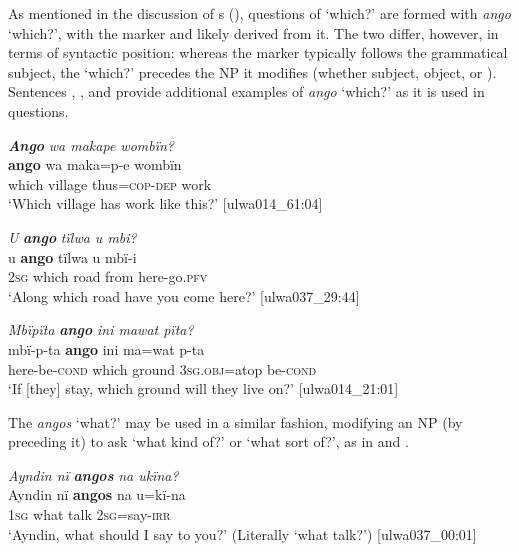 As mentioned in the discussion of s (), questions of ‘which?’ are formed with \textit{ango} ‘which?’,  with the  marker and likely derived from it. The two differ, however, in terms of syntactic position: whereas the  marker typically follows the grammatical subject, the  ‘which?’ precedes the NP it modifies (whether subject, object, or ). Sentences , , and  provide additional examples of \textit{ango} ‘which?’ as it is used in questions.

\ea%
    \label{ex:syntax:31}
          \textbf{\textit{Ango}} \textit{wa makape wombïn?}\\
\gll    \textbf{ango}  wa     maka=p-e    wombïn\\
    which  village  thus=\textsc{cop-dep}  work\\
\glt `Which village has work like this?’ [ulwa014\_61:04]
\z

\ea%
    \label{ex:syntax:32}
          \textit{U} \textbf{\textit{ango}} \textit{tïlwa u mbi?}\\
\gll    u    \textbf{ango}  tïlwa  u    mbï-i\\
    2\textsc{sg}  which  road  from  here-go.\textsc{pfv}\\
\glt `Along which road have you come here?’ [ulwa037\_29:44]
\z

\ea%
    \label{ex:syntax:33}
          \textit{Mbïpïta} \textbf{\textit{ango}} \textit{ini mawat pïta?}\\
\gll    mbï-p-ta    \textbf{ango}  ini    ma=wat    p-ta\\
    here-be\textsc{{}-cond} which  ground  3\textsc{sg.obj}=atop  be\textsc{{}-cond}\\
\glt `If [they] stay, which ground will they live on?’ [ulwa014\_21:01]
\z

The  \textit{angos} ‘what?’ may be used in a similar fashion, modifying an NP (by preceding it) to ask ‘what kind of?’ or ‘what sort of?’, as in  and .

\ea%
    \label{ex:syntax:34}
          \textit{Ayndin nï} \textbf{\textit{angos}} \textit{na ukïna?}\\
\gll    Ayndin  nï    \textbf{angos}  na    u=kï-na\\
    [name]  1\textsc{sg}  what  talk  2\textsc{sg}=say-\textsc{irr}\\
\glt `Ayndin, what should I say to you?’ (Literally ‘what talk?’) [ulwa037\_00:01]
\z

